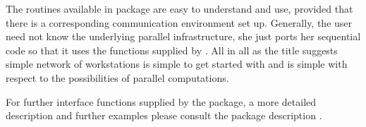 The routines available in package  are easy to understand
and use, provided that there is a corresponding communication
environment set up. Generally, the user need not know the underlying
parallel infrastructure, she just ports her sequential code so that it
uses the functions supplied by . All in all as the title
suggests simple network of workstations is simple to get started with
and is simple with respect to the possibilities of parallel
computations. 

For further interface functions supplied by the  package, a
more detailed 
description and further examples please consult the package description
\cite{tierney07snow}.

